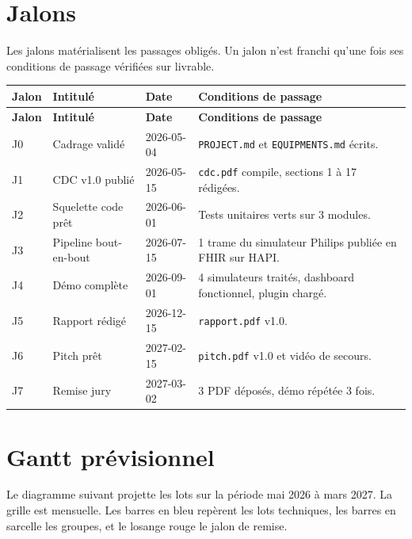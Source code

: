 \section{Jalons}
\label{sec:jalons}

Les jalons matérialisent les passages obligés. Un jalon n'est franchi qu'une fois ses conditions de passage vérifiées sur livrable.

\bridgezebra
\begin{longtable}{p{1.8cm}p{4.5cm}p{2.8cm}p{6cm}}
  \toprule
  \rowcolor{bridgeblue!90}
  {\color{white}\bfseries Jalon} & {\color{white}\bfseries Intitulé} & {\color{white}\bfseries Date} & {\color{white}\bfseries Conditions de passage} \\
  \midrule
  \endfirsthead
  \toprule
  \rowcolor{bridgeblue!90}
  {\color{white}\bfseries Jalon} & {\color{white}\bfseries Intitulé} & {\color{white}\bfseries Date} & {\color{white}\bfseries Conditions de passage} \\
  \midrule
  \endhead
  \bottomrule
  \endfoot
  J0 & Cadrage validé          & 2026-05-04 & \texttt{PROJECT.md} et \texttt{EQUIPMENTS.md} écrits. \\
  J1 & CDC v1.0 publié         & 2026-05-15 & \texttt{cdc.pdf} compile, sections 1 à 17 rédigées. \\
  J2 & Squelette code prêt     & 2026-06-01 & Tests unitaires verts sur 3 modules. \\
  J3 & Pipeline bout-en-bout   & 2026-07-15 & 1 trame du simulateur Philips publiée en FHIR sur HAPI. \\
  J4 & Démo complète           & 2026-09-01 & 4 simulateurs traités, dashboard fonctionnel, plugin chargé. \\
  J5 & Rapport rédigé          & 2026-12-15 & \texttt{rapport.pdf} v1.0. \\
  J6 & Pitch prêt              & 2027-02-15 & \texttt{pitch.pdf} v1.0 et vidéo de secours. \\
  J7 & Remise jury             & 2027-03-02 & 3 PDF déposés, démo répétée 3 fois. \\
\end{longtable}

\section{Gantt prévisionnel}
\label{sec:gantt}

Le diagramme suivant projette les lots sur la période mai 2026 à mars 2027. La grille est mensuelle. Les barres en bleu repèrent les lots techniques, les barres en sarcelle les groupes, et le losange rouge le jalon de remise.

